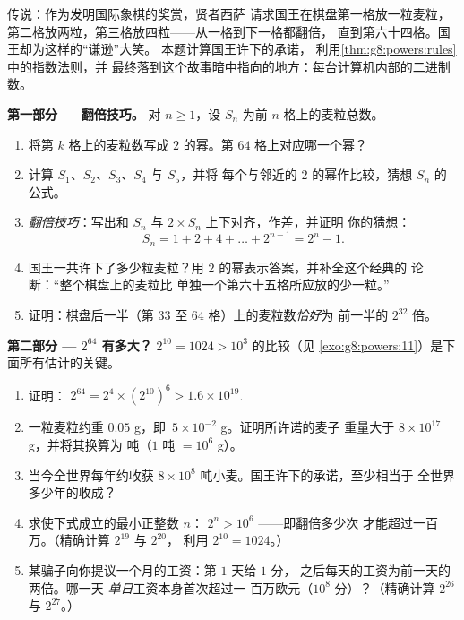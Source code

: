 \begin{problem}[{周末问题 --- 等比数列求和
$1 + 2 + 4 + \dots + 2^{n-1} = 2^n - 1$，由一个著名传说通向
二进制数}]
\label{pb:g8:powers:1}
传说：作为发明国际象棋的奖赏，贤者西萨
请求国王在棋盘第一格放一粒麦粒，
第二格放两粒，第三格放四粒——从一格到下一格都翻倍，
直到第六十四格。国王却为这样的“谦逊”大笑。
本题计算国王许下的承诺，
利用\cref{thm:g8:powers:rules}中的指数法则，并
最终落到这个故事暗中指向的地方：每台计算机内部的二进制数。

\medskip
\noindent\textbf{第一部分 --- 翻倍技巧。}
对 $n \geq 1$，设 $S_n$ 为前
$n$ 格上的麦粒总数。
\begin{enumerate}
  \item 将第 $k$ 格上的麦粒数写成
        $2$ 的幂。第 $64$ 格上对应哪一个幂？
  \item 计算 $S_1$、$S_2$、$S_3$、$S_4$ 与 $S_5$，并将
        每个与邻近的 $2$ 的幂作比较，猜想
        $S_n$ 的公式。
  \item \emph{翻倍技巧}：写出和 $S_n$ 与
        $2 \times S_n$ 上下对齐，作差，并证明
        你的猜想：
        \[
        S_n = 1 + 2 + 4 + \dots + 2^{n-1} = 2^n - 1 .
        \]
  \item 国王一共许下了多少粒麦粒？用
        $2$ 的幂表示答案，并补全这个经典的
        论断：“整个棋盘上的麦粒比
        单独一个第六十五格所应放的少一粒。”
  \item 证明：棋盘后一半（第 $33$ 至
        $64$ 格）上的麦粒数\emph{恰好}为
        前一半的 $2^{32}$ 倍。
\end{enumerate}

\medskip
\noindent\textbf{第二部分 --- $2^{64}$ 有多大？}
$2^{10} = 1024 > 10^3$ 的比较（见
\cref{exo:g8:powers:11}）是下面所有估计的关键。
\begin{enumerate}[resume]
  \item 证明：
        $2^{64} = 2^4 \times \left(2^{10}\right)^6 > 1.6 \times
        10^{19}$.
  \item 一粒麦粒约重 $0.05$ g，即\
        $5 \times 10^{-2}$ g。证明所许诺的麦子
        重量大于 $8 \times 10^{17}$ g，并将其换算为
        吨（$1$ 吨 $= 10^6$ g）。
  \item 当今全世界每年约收获 $8 \times 10^8$
        吨小麦。国王许下的承诺，至少相当于
        全世界多少年的收成？
  \item 求使下式成立的最小正整数 $n$：
        $2^n > 10^6$ ——即翻倍多少次
        才能超过一百万。（精确计算 $2^{19}$ 与 $2^{20}$，
        利用 $2^{10} = 1024$。）
  \item 某骗子向你提议一个月的工资：第 $1$ 天给 $1$ 分，
        之后每天的工资为前一天的两倍。哪一天
        \emph{单日}工资本身首次超过一
        百万欧元（$10^8$ 分）？（精确计算 $2^{26}$ 与
        $2^{27}$。）
\end{enumerate}


\end{problem}
